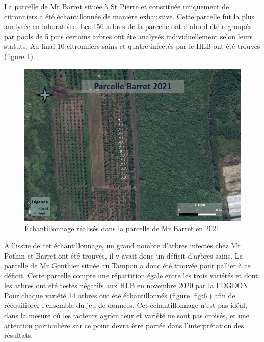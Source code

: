 \documentclass[
  11pt,
  french,
  a4paper,
  extrafontsizes,onecolumn,openright
  ]{memoir}
\begin{document}
\normalsize

La parcelle de Mr Barret située à St Pierre et constituée uniquement de citronniers a été échantillonnée de manière exhaustive. Cette parcelle fut la plus analysée en laboratoire. Les 156 arbres de la parcelle ont d'abord été regroupés par pools de 5 puis certains arbres ont été analysés individuellement selon leurs statuts. Au final 10 citronniers sains et quatre infectés par le HLB ont été trouvés (figure \ref{fig:5}).

\scriptsize

\begin{figure}

{\centering \includegraphics[width=0.8\linewidth]{Images/Figure5} 

}

\caption{Échantillonnage réalisés dans la parcelle de Mr Barret en 2021}\label{fig:5}
\end{figure}

\normalsize
\vfill
\newpage
A l'issue de cet échantillonnage, un grand nombre d'arbres infectés chez Mr Pothin et Barret ont été trouvés, il y avait donc un déficit d'arbres sains. La parcelle de Mr Gonthier située au Tampon a donc été trouvée pour pallier à ce déficit. Cette parcelle compte une répartition égale entre les trois variétés et dont les arbres ont été testés négatifs aux HLB en novembre 2020 par la FDGDON. Pour chaque variété 14 arbres ont été échantillonnés (figure \ref{fig:6}) afin de rééquilibrer l'ensemble du jeu de données. Cet échantillonnage n'est pas idéal, dans la mesure où les facteurs agriculteur et variété ne sont pas croisés, et une attention particulière sur ce point devra être portée dans l'interprétation des résultats.

\scriptsize
\end{document}
